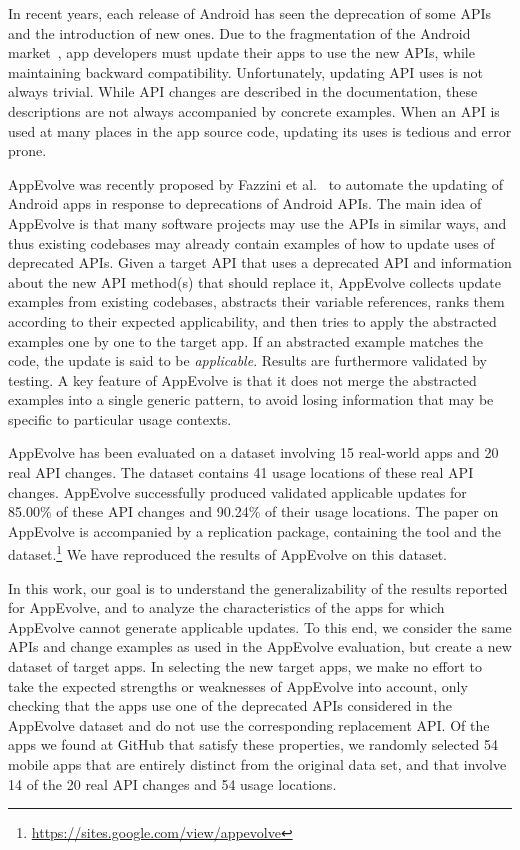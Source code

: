 In recent years, each release of Android has seen the deprecation of some
APIs and the introduction of new ones.  Due to the fragmentation of the
Android market~\cite{he2018understanding,li2018cid}, app developers must
update their apps to use the new APIs, while maintaining backward
compatibility.  Unfortunately, updating API uses is not always trivial.
While API changes are described in the documentation, these descriptions
are not always accompanied by concrete examples.  When an API is used at
many places in the app source code, updating its uses is tedious and
error prone.

AppEvolve was recently proposed by Fazzini et
al.~\cite{fazzini2019automated} to automate the updating of Android apps in
response to deprecations of Android APIs.  The main idea of AppEvolve is
that many software projects may use the APIs in similar ways, and thus
existing codebases may already contain examples of how to update uses of
deprecated APIs.  Given a target API that uses a deprecated API and
information about the new API method(s) that should replace it, AppEvolve
collects update examples from existing codebases, abstracts their variable
references, ranks them according to their expected applicability, and then
tries to apply the abstracted examples one by one to the target app.  If an
abstracted example matches the code, the update is said to be {\em
applicable}.  Results are furthermore validated by testing.  A key feature
of AppEvolve is that it does not merge the abstracted examples into a
single generic pattern, to avoid losing information that may be specific to
particular usage contexts.

AppEvolve has been evaluated on a dataset involving 15 real-world apps and
20 real API changes. The dataset contains 41 usage locations of these real
API changes. AppEvolve successfully produced validated applicable updates
for 85.00\% of these API changes and 90.24\% of their usage locations.  The
paper on AppEvolve is accompanied by a replication package, containing the
tool and the
dataset.\footnote{\url{https://sites.google.com/view/appevolve}} We have
reproduced the results of AppEvolve on this dataset.

In this work, our goal is to understand the generalizability of the results
reported for AppEvolve, and to analyze the characteristics of the apps for
which AppEvolve cannot generate applicable updates.  To this end, we
consider the same APIs and change examples as used in the AppEvolve
evaluation, but create a new dataset of target apps.  In selecting the new
target apps, we make no effort to take the expected strengths or weaknesses
of AppEvolve into account, only checking that the apps use one of the
deprecated APIs considered in the AppEvolve dataset and do not use the
corresponding replacement API.  Of the apps we found at GitHub that satisfy
these properties, we randomly selected 54 mobile apps that are entirely
distinct from the original data set, and that involve 14 of the 20 real API
changes and 54 usage locations.

